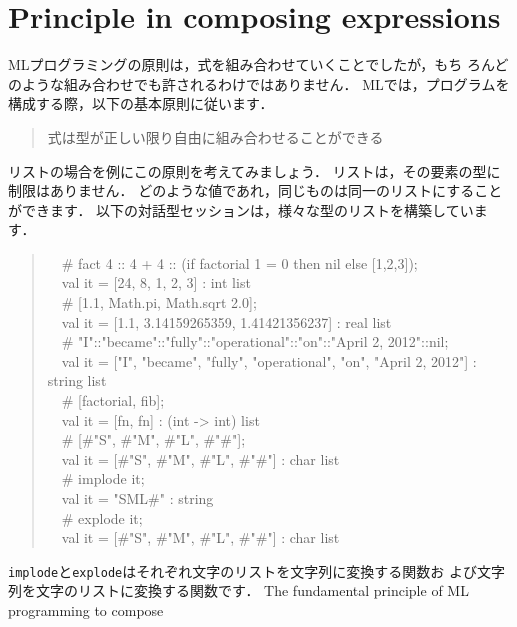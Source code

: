 \documentclass{jbook}
\newif\ifjp
\newcommand{\txt}[2]{#2}
\newcommand{\myem}{\mbox{\ \ }}
\begin{document}
\section{\txt{式の組み合わせの原則}{Principle in composing expressions}}
\label{sec:tutorialTypingprinciple}

\ifjp%
	MLプログラミングの原則は，式を組み合わせていくことでしたが，もち
ろんどのような組み合わせでも許されるわけではありません．
	MLでは，プログラムを構成する際，以下の基本原則に従います．
\begin{quote}
式は型が正しい限り自由に組み合わせることができる
\end{quote}
	リストの場合を例にこの原則を考えてみましょう．
	リストは，その要素の型に制限はありません．
	どのような値であれ，同じものは同一のリストにすることができます．
	以下の対話型セッションは，様々な型のリストを構築しています．
\begin{tt}
\begin{quote}
\myem \# fact 4 :: 4 + 4 :: (if factorial 1 = 0 then nil else [1,2,3]);
\\\myem  val it = [24, 8, 1, 2, 3] : int list
\\\myem   \# [1.1, Math.pi, Math.sqrt 2.0];
\\\myem   val it = [1.1, 3.14159265359, 1.41421356237] : real list
\\\myem   \# "I"::"became"::"fully"::"operational"::"on"::"April 2, 2012"::nil;
\\\myem   val it = ["I", "became", "fully", "operational", "on", "April 2, 2012"] : string list
\\\myem   \# [factorial, fib];
\\\myem   val it = [fn, fn] : (int  -> int) list
\\\myem   \# [\#"S", \#"M", \#"L", \#"\#"];
\\\myem   val it = [\#"S", \#"M", \#"L", \#"\#"] : char list
\\\myem   \# implode it;
\\\myem   val it = "SML\#" : string
\\\myem   \# explode it;
\\\myem   val it = [\#"S", \#"M", \#"L", \#"\#"] : char list
\end{quote}
\end{tt}
{\tt implode}と{\tt explode}はそれぞれ文字のリストを文字列に変換する関数お
よび文字列を文字のリストに変換する関数です．
\else%
	The fundamental principle of ML programming to compose
\end{document}

